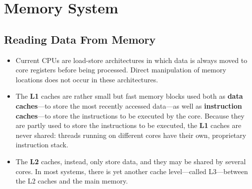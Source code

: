 \documentclass[12pt,a4paper]{article}
\begin{document}
\section{Memory System}
\subsection{Reading Data From Memory}
\begin{itemize}
	\item Current CPUs are load-store architectures in which data is always moved to core registers before being processed. Direct manipulation of memory locations does not occur in these architectures.
	\item The \textbf{L1} caches are rather small but fast memory blocks used both as \textbf{data caches}---to store the most recently accessed data---as well as \textbf{instruction caches}---to store the instructions to be executed by the core. Because they are partly used to store the instructions to be executed, the \textbf{L1} caches are never shared: threads running on different cores have their own, proprietary instruction stack. 
	\item The \textbf{L2} caches, instead, only store data, and they may be shared by several cores. In most systems, there is yet another cache level---called L3---between the L2 caches and the main memory.
\end{itemize}
\end{document}
